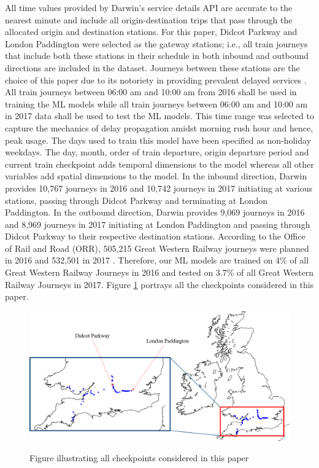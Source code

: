 \documentclass[]{interact}
\theoremstyle{plain}%
\theoremstyle{definition}
\theoremstyle{remark}
\begin{document}
All time values provided by Darwin’s service details API are accurate to the nearest minute and include all origin-destination trips that pass through the allocated origin and destination stations. For this paper, Didcot Parkway and London Paddington were selected as the gateway stations; i.e., all train journeys that include both these stations in their schedule in both inbound and outbound directions are included in the dataset. Journeys between these stations are the choice of this paper due to its notoriety in providing prevalent delayed services \citep{DFT16}. All train journeys between 06:00 am and 10:00 am from 2016 shall be used in training the ML models while all train journeys between 06:00 am and 10:00 am in 2017 data shall be used to test the ML models. This time range was selected to capture the mechanics of delay propagation amidst morning rush hour and hence, peak usage. The days used to train this model have been specified as non-holiday weekdays. The day, month, order of train departure, origin departure period and current train checkpoint adds temporal dimensions to the model whereas all other variables add spatial dimensions to the model. In the inbound direction, Darwin provides 10,767 journeys in 2016 and 10,742 journeys in 2017 initiating at various stations, passing through Didcot Parkway and terminating at London Paddington. In the outbound direction, Darwin provides 9,069 journeys in 2016 and 8,969 journeys in 2017 initiating at London Paddington and passing through Didcot Parkway to their respective destination stations. According to the Office of Rail and Road (ORR), 505,215 Great Western Railway journeys were planned in 2016 and 532,501 in 2017 \citep{ORRGWR19}. Therefore, our ML models are trained on 4\% of all Great Western Railway Journeys in 2016 and tested on 3.7\% of all Great Western Railway Journeys in 2017. Figure \ref{Schematic} portrays all the checkpoints considered in this paper. 

\begin{figure}[h!]
\centering
{%
{\includegraphics[width=\textwidth]{Images/Schematic.png}}}
\caption{Figure illustrating all checkpoints considered in this paper} \label{Schematic}
\end{figure}
\end{document}
